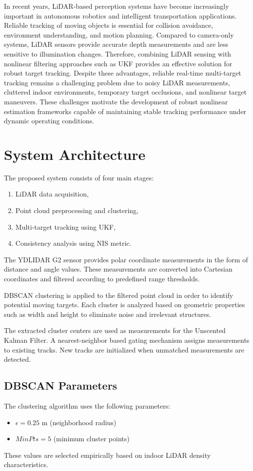 \documentclass[conference]{IEEEtran}
\begin{document}
In recent years, LiDAR-based perception systems have become increasingly important in autonomous robotics and intelligent transportation applications. Reliable tracking of moving objects is essential for collision avoidance, environment understanding, and motion planning. Compared to camera-only systems, LiDAR sensors provide accurate depth measurements and are less sensitive to illumination changes. Therefore, combining LiDAR sensing with nonlinear filtering approaches such as UKF provides an effective solution for robust target tracking. Despite these advantages, reliable real-time multi-target tracking remains a challenging problem due to noisy LiDAR measurements, cluttered indoor environments, temporary target occlusions, and nonlinear target maneuvers. These challenges motivate the development of robust nonlinear estimation frameworks capable of maintaining stable tracking performance under dynamic operating conditions.

\section{System Architecture}
The proposed system consists of four main stages:
\begin{enumerate}
    \item LiDAR data acquisition,
    \item Point cloud preprocessing and clustering,
    \item Multi-target tracking using UKF,
    \item Consistency analysis using NIS metric.
\end{enumerate}

The YDLIDAR G2 sensor provides polar coordinate measurements in the form of distance and angle values. These measurements are converted into Cartesian coordinates and filtered according to predefined range thresholds.

DBSCAN clustering is applied to the filtered point cloud in order to identify potential moving targets. Each cluster is analyzed based on geometric properties such as width and height to eliminate noise and irrelevant structures.

The extracted cluster centers are used as measurements for the Unscented Kalman Filter. A nearest-neighbor based gating mechanism assigns measurements to existing tracks. New tracks are initialized when unmatched measurements are detected.

\subsection{DBSCAN Parameters}
The clustering algorithm uses the following parameters:
\begin{itemize}
    \item $\epsilon = 0.25$ m (neighborhood radius)
    \item $MinPts = 5$ (minimum cluster points)
\end{itemize}
These values are selected empirically based on indoor LiDAR density characteristics.
\end{document}
